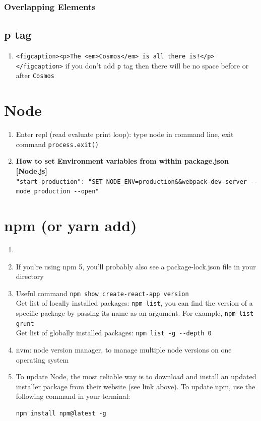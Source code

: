 \documentclass[a4paper, 12pt]{article}
\begin{document}
\subsubsection{Overlapping Elements}





\subsection{p tag}
\begin{enumerate}
\item \verb|<figcaption><p>The <em>Cosmos</em> is all there is!</p></figcaption>| if you don't add \verb|p| tag then there will be no space before or after \verb|Cosmos|
\end{enumerate}


\section{Node}
\begin{enumerate}
\item Enter repl (read evaluate print loop): type node in command line, exit command \verb|process.exit()|
\item \textbf{How to set Environment variables from within package.json [Node.js]}\\
\verb|"start-production": "SET NODE_ENV=production&&webpack-dev-server --mode production --open"|
\end{enumerate}



\section{npm (or yarn add)}
\begin{enumerate}

\item 

\item If you're using npm 5, you'll probably also see a package-lock.json file in your directory

\item Useful command \verb|npm show create-react-app version|\\
Get list of locally installed packages: \verb|npm list|, you can find the version of a specific package by passing its name as an argument. For example, \verb|npm list grunt|\\
Get list of globally installed packages: \verb|npm list -g --depth 0|

\item nvm: node version manager, to manage multiple node versions on one operating system

\item To update Node, the most reliable way is to download and install an updated installer package from their website (see link above). To update npm, use the following command in your terminal:
\begin{verbatim}
npm install npm@latest -g
\end{verbatim}
\end{enumerate}
\end{document}
